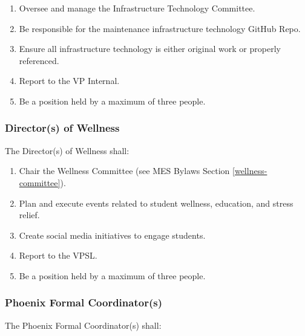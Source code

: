 \begin{enumerate}
 \item    
  Oversee and manage the Infrastructure Technology Committee. 
 \item    
  Be responsible for the maintenance infrastructure technology GitHub Repo. 
 \item     
  Ensure all infrastructure technology is either original work or properly referenced. 
 \item     
  Report to the VP Internal. 
 \item    
  Be a position held by a maximum of three people. 
  
\end{enumerate}

\subsubsection{Director(s) of Wellness}
\label{directors-of-wellness}
The Director(s) of Wellness shall:

\begin{enumerate}
 \item
  Chair the Wellness Committee (see MES Bylaws Section \ref{wellness-committee}).
 \item
  Plan and execute events related to student wellness, education, and stress relief.
 \item
  Create social media initiatives to engage students.
 \item
  Report to the VPSL.
 \item
  Be a position held by a maximum of three people.

\end{enumerate}

\subsubsection{Phoenix Formal Coordinator(s)}
\label{phoenix-formal-coordinators}
The Phoenix Formal Coordinator(s) shall:

